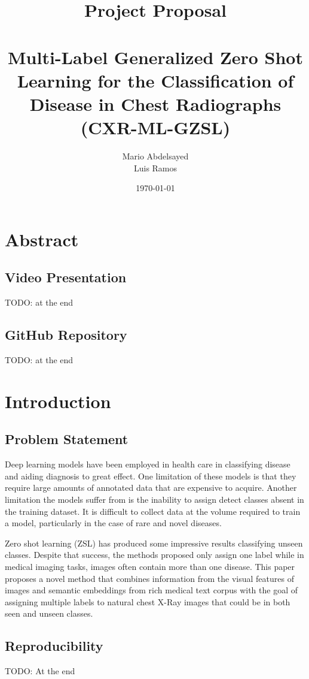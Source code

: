 \documentclass[letterpaper]{article} %
\title{Project Proposal \\ \\ Multi-Label Generalized Zero Shot Learning for the Classification of Disease in Chest Radiographs (CXR-ML-GZSL)}
\author{
    Mario Abdelsayed\\
    Luis Ramos\\
}
\date{\today}
\begin{document}
\maketitle


\section{Abstract}
\subsection{Video Presentation}
TODO: at the end 
\subsection{GitHub Repository}
TODO: at the end
\section{Introduction}

\subsection{Problem Statement}

Deep learning models have been employed in health care in classifying disease and
aiding diagnosis to great effect. One limitation of these models is that they require large
amounts of annotated data that are expensive to acquire. Another limitation the models
suffer from is the inability to assign detect classes absent in the training dataset. It is
difficult to collect data at the volume required to train a model, particularly in the
case of rare and novel diseases.

Zero shot learning (ZSL) has produced some impressive results classifying unseen
classes. Despite that success, the methods proposed only assign one label while in
medical imaging tasks, images often contain more than one disease. This paper proposes a
novel method that combines information from the visual features of images and semantic
embeddings from rich medical text corpus with the goal of assigning multiple labels to natural chest X-Ray images that could be in both seen and unseen classes.



\subsection{Reproducibility}
TODO: At the end
\end{document}
